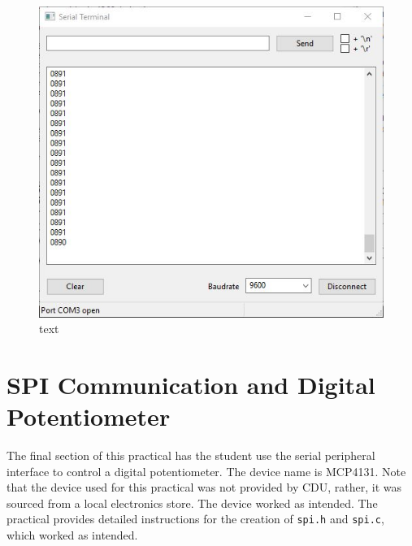 \documentclass[a4paper]{article}
\begin{document}
\begin{figure}[h]
	\centering
	\includegraphics[scale=0.6]{fig6}
	\caption{text}
\end{figure}

\newpage

\section{SPI Communication and Digital Potentiometer}
The final section of this practical has the student use the serial peripheral interface to control a digital potentiometer. The device name is MCP4131. Note that the device used for this practical was not provided by CDU, rather, it was sourced from a local electronics store. The device worked as intended. The practical provides detailed instructions for the creation of \verb|spi.h| and \verb|spi.c|, which worked as intended.\\
\end{document}
